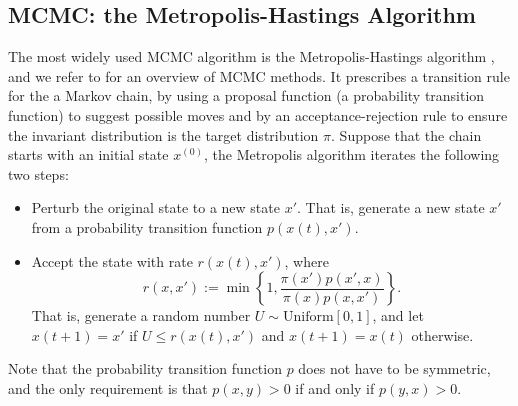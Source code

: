 \documentclass[12pt]{article}
\begin{document}
\subsection{MCMC: the Metropolis-Hastings Algorithm}

The most widely used MCMC algorithm is the Metropolis-Hastings algorithm \cite{hastings1970}, and we refer to \cite{Liu01} for an overview of MCMC methods. It prescribes a transition rule for the a Markov chain, by using a proposal function (a probability transition function) to suggest possible moves and by an acceptance-rejection rule to ensure the invariant distribution is the target distribution $\pi$. Suppose that the chain starts with an initial state $x^{(0)}$, the Metropolis algorithm iterates the following two steps: 

\begin{itemize} 
\item Perturb the original state to a new state $x'$. That is, generate a new state $x'$ from a probability transition function $p(x(t),x')$. 
\item Accept the state with rate $r(x(t),x')$, where 
\[
r(x,x'):= \min\left\{1, \frac{\pi(x')p(x',x)}{\pi(x) p(x,x')}\right\}.
\] That is, generate a random number $U\sim \mathrm{ Uniform[0,1]}$, and let $x(t+1) = x'$  if $U\leq r(x(t),x') $ and $x(t+1) = x(t)$ otherwise. 
\end{itemize}
Note that the probability transition function $p$ does not have to be symmetric, and the only requirement is that $p(x,y)>0$ if and only if $p(y,x)>0$. 
\end{document}
